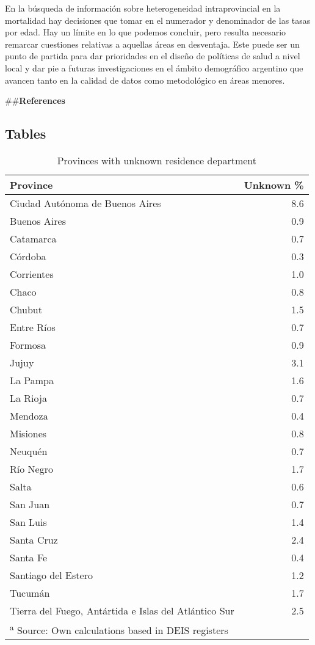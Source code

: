 \documentclass[12pt,]{article}
\begin{document}
En la búsqueda de información sobre heterogeneidad intraprovincial en la
mortalidad hay decisiones que tomar en el numerador y denominador de las
tasas por edad. Hay un límite en lo que podemos concluir, pero resulta
necesario remarcar cuestiones relativas a aquellas áreas en desventaja.
Este puede ser un punto de partida para dar prioridades en el diseño de
políticas de salud a nivel local y dar pie a futuras investigaciones en
el ámbito demográfico argentino que avancen tanto en la calidad de datos
como metodológico en áreas menores.

\#\#\textbf{References}

\hypertarget{tables}{%
\subsection{Tables}\label{tables}}

\begin{table}

\caption{\label{tab:SinDEP}Provinces with unknown residence department}
\centering
\begin{tabular}[t]{l|r}
\hline
Province & Unknown \%\\
\hline
Ciudad Autónoma de Buenos Aires & 8.6\\
\hline
Buenos Aires & 0.9\\
\hline
Catamarca & 0.7\\
\hline
Córdoba & 0.3\\
\hline
Corrientes & 1.0\\
\hline
Chaco & 0.8\\
\hline
Chubut & 1.5\\
\hline
Entre Ríos & 0.7\\
\hline
Formosa & 0.9\\
\hline
Jujuy & 3.1\\
\hline
La Pampa & 1.6\\
\hline
La Rioja & 0.7\\
\hline
Mendoza & 0.4\\
\hline
Misiones & 0.8\\
\hline
Neuquén & 0.7\\
\hline
Río Negro & 1.7\\
\hline
Salta & 0.6\\
\hline
San Juan & 0.7\\
\hline
San Luis & 1.4\\
\hline
Santa Cruz & 2.4\\
\hline
Santa Fe & 0.4\\
\hline
Santiago del Estero & 1.2\\
\hline
Tucumán & 1.7\\
\hline
Tierra del Fuego, Antártida e Islas del Atlántico Sur & 2.5\\
\hline
\multicolumn{2}{l}{\textsuperscript{a} Source: Own calculations based in DEIS registers}\\
\end{tabular}
\end{table}
\end{document}
